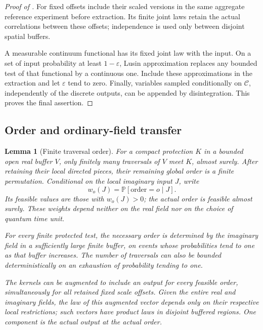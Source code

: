 \documentclass[11pt]{article}
\numberwithin{equation}{section}
\newtheorem{lemma}[theorem]{Lemma}
\theoremstyle{definition}
\theoremstyle{remark}
\newcommand{\PP}{\mathbb P}
\newcommand{\1}{\mathbf 1}
\begin{document}
\begin{proof}[Proof of ]
For fixed offsets include their scaled versions in the same aggregate
reference experiment before extraction. Its finite joint laws retain
the actual correlations between these offsets; independence is used
only between disjoint spatial buffers.

A measurable continuum functional has its fixed joint law with the
input. On a set of input probability at least \(1-\varepsilon\),
Lusin approximation replaces any bounded test of that functional by
a continuous one. Include these approximations in the extraction and
let \(\varepsilon\) tend to zero. Finally, variables sampled
conditionally on \(\mathcal C\), independently of the discrete outputs,
can be appended by disintegration. This proves the final assertion.
\end{proof}

\subsection{Order and ordinary-field transfer}

\begin{lemma}[Finite traversal order]\label{ker:finite-order}
For a compact protection \(K\) in a bounded open real buffer \(V\),
only finitely many traversals of \(V\) meet \(K\), almost surely.
After retaining their local directed pieces, their remaining global
order is a finite permutation.  Conditional on the local imaginary
input \(J\), write
\[
 w_o(J)=\PP[\text{order}=o\mid J].
\]
Its feasible values are those with \(w_o(J)>0\); the actual order is
feasible almost surely.  These weights depend neither on the real
field nor on the choice of quantum time unit.

For every finite protected test, the necessary order is determined
by the imaginary field in a sufficiently large finite buffer, on
events whose probabilities tend to one as that buffer increases.
The number of traversals can also be bounded deterministically on
an exhaustion of probability tending to one.

The kernels can be augmented to include an output for every feasible
order, simultaneously for all retained fixed scale offsets.  Given
the entire real and imaginary fields, the law of this augmented
vector depends only on their respective local restrictions; such
vectors have product laws in disjoint buffered regions.  One component
is the actual output at the actual order.
\end{lemma}
\end{document}
